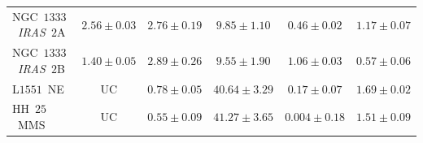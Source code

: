 \documentclass[9pt]{extarticle}   	%
\begin{document}
\begin{table}[h!]
\begin{center}
\begin{tabular}{lccccc}
NGC~$1333$~\textit{IRAS}~$2$A & $2.56\pm0.03$ & $2.76\pm0.19$ & $9.85\pm1.10$ & $0.46\pm0.02$ & $1.17\pm0.07$  \\
NGC~$1333$~\textit{IRAS}~$2$B & $1.40\pm0.05$ & $2.89\pm0.26$ & $9.55\pm1.90$ & $1.06\pm0.03$ & $0.57\pm0.06$  \\
L$1551$~NE & UC & $0.78\pm0.05$ & $40.64\pm3.29$ & $0.17\pm0.07$ & $1.69\pm0.02$  \\
HH~$25$~MMS & UC & $0.55\pm0.09$ & $41.27\pm3.65$ & $0.004\pm0.18$ & $1.51\pm0.09$  \\
\hline\hline
\end{tabular}
\end{center}
\end{table}




\clearpage
\end{document}
